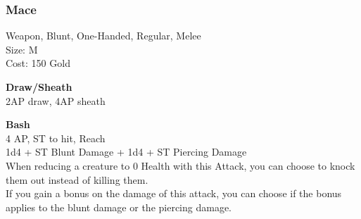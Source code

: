 \subsubsection{Mace}\label{weapon:mace}
Weapon, Blunt, One-Handed, Regular, Melee\\
Size: M\\
Cost: 150 Gold

\textbf{Draw/Sheath}\\
2AP draw, 4AP sheath

\textbf{Bash}\\
4 AP, ST to hit,  Reach\\
1d4 + \texttimes ST Blunt Damage + 1d4 + \texttimes ST Piercing Damage\\
When reducing a creature to 0 Health with this Attack, you can choose to knock them out instead of killing them.\\
If you gain a bonus on the damage of this attack, you can choose if the bonus applies to the blunt damage or the piercing damage.